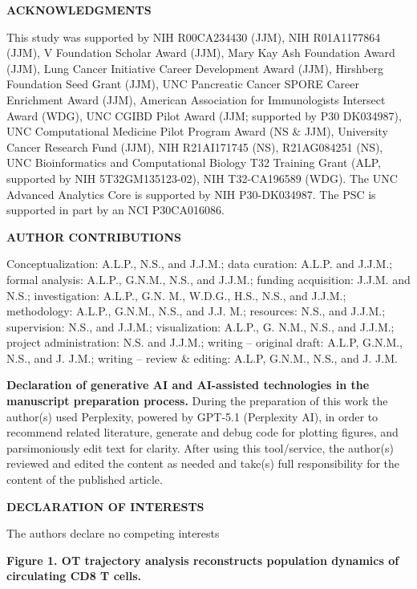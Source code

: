 \textbf{ACKNOWLEDGMENTS}

This study was supported by NIH R00CA234430 (JJM), NIH R01A1177864
(JJM), V Foundation Scholar Award (JJM), Mary Kay Ash Foundation Award
(JJM), Lung Cancer Initiative Career Development Award (JJM), Hirshberg
Foundation Seed Grant (JJM), UNC Pancreatic Cancer SPORE Career
Enrichment Award (JJM), American Association for Immunologists Intersect
Award (WDG), UNC CGIBD Pilot Award (JJM; supported by P30 DK034987), UNC
Computational Medicine Pilot Program Award (NS \& JJM), University
Cancer Research Fund (JJM), NIH R21AI171745 (NS), R21AG084251 (NS), UNC
Bioinformatics and Computational Biology T32 Training Grant (ALP,
supported by NIH 5T32GM135123-02), NIH T32-CA196589 (WDG). The UNC
Advanced Analytics Core is supported by NIH P30-DK034987. The PSC is
supported in part by an NCI P30CA016086.

\textbf{AUTHOR CONTRIBUTIONS}

Conceptualization: A.L.P., N.S., and J.J.M.; data curation: A.L.P. and
J.J.M.; formal analysis: A.L.P., G.N.M., N.S., and J.J.M.; funding
acquisition: J.J.M. and N.S.; investigation: A.L.P., G.N. M., W.D.G.,
H.S., N.S., and J.J.M.; methodology: A.L.P., G.N.M., N.S., and J.J. M.;
resources: N.S., and J.J.M.; supervision: N.S., and J.J.M.;
visualization: A.L.P., G. N.M., N.S., and J.J.M.; project
administration: N.S. and J.J.M.; writing -- original draft: A.L.P,
G.N.M., N.S., and J. J.M.; writing -- review \& editing: A.L.P, G.N.M.,
N.S., and J. J.M.

\textbf{Declaration of generative AI and AI-assisted technologies in the
manuscript preparation process.} During the preparation of this work the
author(s) used Perplexity, powered by GPT‑5.1 (Perplexity AI), in order
to recommend related literature, generate and debug code for plotting
figures, and parsimoniously edit text for clarity. After using this
tool/service, the author(s) reviewed and edited the content as needed
and take(s) full responsibility for the content of the published
article.

\textbf{DECLARATION OF INTERESTS }

The authors declare no competing interests

\textbf{Figure 1. OT trajectory analysis reconstructs population
dynamics of circulating CD8 T cells.}

